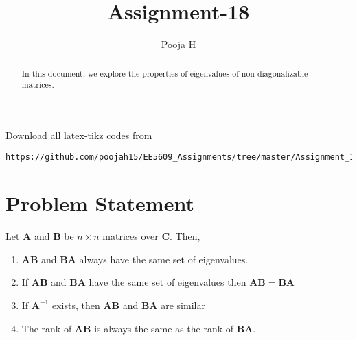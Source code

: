 \documentclass[journal,12pt,twocolumn]{IEEEtran}
\begin{document}
	\makeatother
	\let\StandardTheFigure\thefigure
	\let\vec\mathbf
	\renewcommand{\thefigure}{\theproblem}
	\def\putbox#1#2#3{\makebox[0in][l]{\makebox[#1][l]{}\raisebox{\baselineskip}[0in][0in]{\raisebox{#2}[0in][0in]{#3}}}}
	\def\rightbox#1{\makebox[0in][r]{#1}}
	\def\centbox#1{\makebox[0in]{#1}}
	\def\topbox#1{\raisebox{-\baselineskip}[0in][0in]{#1}}
	\def\midbox#1{\raisebox{-0.5\baselineskip}[0in][0in]{#1}}
	\vspace{3cm}
	\title{Assignment-18}
	\author{Pooja H}
	\maketitle
	\newpage
	\bigskip
	\renewcommand{\thefigure}{\theenumi}
	\renewcommand{\thetable}{\theenumi}
	\begin{abstract}
		In this document, we explore the properties of eigenvalues of non-diagonalizable matrices.
	\end{abstract}
	Download all latex-tikz codes from 
\begin{lstlisting}
https://github.com/poojah15/EE5609_Assignments/tree/master/Assignment_18
\end{lstlisting}
	\section{Problem Statement}

Let $\vec{A}$ and $\vec{B}$ be $n \times n$ matrices over $\vec{C}$. Then,
\begin{enumerate}
	\item $\vec{AB}$ and $\vec{BA}$ always have the same set of eigenvalues.
	\item If $\vec{AB}$ and $\vec{BA}$ have the same set of eigenvalues then $\vec{AB=BA}$
	\item If $\vec{A}^{-1}$ exists, then $\vec{AB}$ and $\vec{BA}$ are similar
	\item The rank of $\vec{AB}$  is always the same as the rank of $\vec{BA}$.
\end{enumerate}
\end{document}
